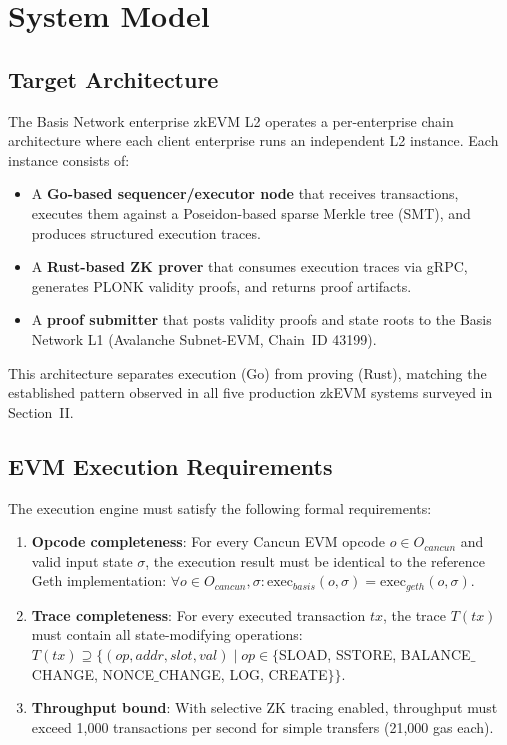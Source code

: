 
\section{System Model}

\subsection{Target Architecture}

The Basis Network enterprise zkEVM L2 operates a per-enterprise chain
architecture where each client enterprise runs an independent L2 instance.
Each instance consists of:

\begin{itemize}
  \item A \textbf{Go-based sequencer/executor node} that receives transactions,
    executes them against a Poseidon-based sparse Merkle tree (SMT), and
    produces structured execution traces.
  \item A \textbf{Rust-based ZK prover} that consumes execution traces via
    gRPC, generates PLONK validity proofs, and returns proof artifacts.
  \item A \textbf{proof submitter} that posts validity proofs and state roots
    to the Basis Network L1 (Avalanche Subnet-EVM, Chain~ID 43199).
\end{itemize}

This architecture separates execution (Go) from proving (Rust), matching the
established pattern observed in all five production zkEVM systems surveyed
in Section~II.

\subsection{EVM Execution Requirements}

The execution engine must satisfy the following formal requirements:

\begin{enumerate}
  \item \textbf{Opcode completeness}: For every Cancun EVM opcode $o \in O_{cancun}$
    and valid input state $\sigma$, the execution result must be identical to
    the reference Geth implementation:
    $\forall o \in O_{cancun}, \sigma: \text{exec}_{basis}(o, \sigma) = \text{exec}_{geth}(o, \sigma)$.

  \item \textbf{Trace completeness}: For every executed transaction $tx$, the
    trace $T(tx)$ must contain all state-modifying operations:
    $T(tx) \supseteq \{(op, addr, slot, val) \mid op \in \{$SLOAD, SSTORE,
    BALANCE$\_$CHANGE, NONCE$\_$CHANGE, LOG, CREATE$\}\}$.

  \item \textbf{Throughput bound}: With selective ZK tracing enabled,
    throughput must exceed 1{,}000 transactions per second for simple
    transfers (21{,}000 gas each).
\end{enumerate}

